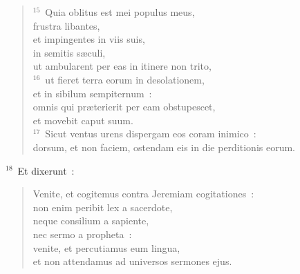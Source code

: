 \begin{flushleft}
\begin{verse}
${}^{15}$~Quia oblitus est mei populus meus,\\ frustra libantes,\\ et impingentes in viis suis,\\ in semitis s\ae culi,\\ ut ambularent per eas in itinere non trito,\\
${}^{16}$~ut fieret terra eorum in desolationem,\\ et in sibilum sempiternum~:\\ omnis qui pr\ae terierit per eam obstupescet,\\ et movebit caput suum.\\
${}^{17}$~Sicut ventus urens dispergam eos coram inimico~:\\ dorsum, et non faciem, ostendam eis in die perditionis eorum.\end{verse}\end{flushleft}


${}^{18}$~Et dixerunt~: \begin{flushleft}\begin{verse}Venite, et cogitemus contra Jeremiam cogitationes~:\\ non enim peribit lex a sacerdote,\\ neque consilium a sapiente,\\ nec sermo a propheta~:\\ venite, et percutiamus eum lingua,\\ et non attendamus ad universos sermones ejus.\end{verse}\end{flushleft}


